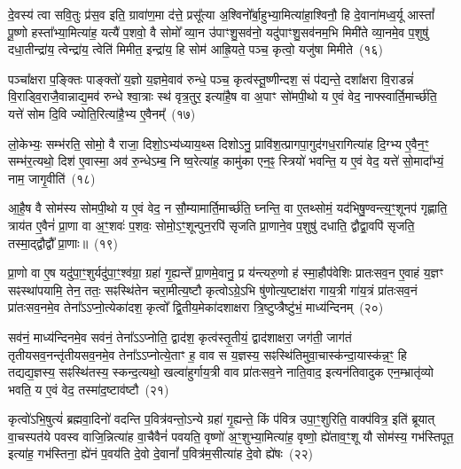 {\anuvakamend[{वा॒चो हव॑म॒भिघृ॑तानां गृह्णात्यु॒त पञ्च॑विꣳशतिश्च}]}%

दे॒वस्य॑ त्वा सवि॒तुः प्र॑स॒व इति॒ ग्रावा॑ण॒मा द॑त्ते॒ प्रसू᳚त्या अ॒श्विनो᳚र्बा॒हुभ्या॒मित्या॑हा॒श्विनौ॒ हि दे॒वाना॑मध्व॒र्यू आस्तां᳚ पू॒ष्णो हस्ता᳚भ्या॒मित्या॑ह॒ यत्यै॑ प॒शवो॒ वै सोमो᳚ व्या॒न उ॑पाꣳशु॒सव॑नो॒ यदु॑पाꣳशु॒सव॑नम॒भि मिमी॑ते व्या॒नमे॒व प॒शुषु॑ दधा॒तीन्द्रा॑य॒ त्वेन्द्रा॑य॒ त्वेति॑ मिमीत॒ इन्द्रा॑य॒ हि सोम॑ आह्रि॒यते॒ पञ्च॒ कृत्वो॒ यजु॑षा मिमीते~(१६)

पञ्चा᳚क्षरा प॒ङ्क्तिः पाङ्क्तो॑ य॒ज्ञो य॒ज्ञमे॒वाव॑ रुन्धे॒ पञ्च॒ कृत्व॑स्तू॒ष्णीन्दश॒ सं प॑द्यन्ते॒ दशा᳚क्षरा वि॒राडन्नं॑ वि॒राड्वि॒राजै॒वान्नाद्य॒मव॑ रुन्धे श्वा॒त्राः स्थ॑ वृत्र॒तुर॒ इत्या॑है॒ष वा अ॒पाꣳ सो॑मपी॒थो य ए॒वं वेद॒ नाफ्स्वार्ति॒मार्च्छ॑ति॒ यत्ते॑ सोम दि॒वि ज्योति॒रित्या॑है॒भ्य ए॒वैनम्᳚~(१७)

लो॒केभ्यः॒ सम्भ॑रति॒ सोमो॒ वै राजा॒ दिशो॒\-ऽभ्य॑ध्याय॒थ्स दिशो\-ऽनु॒ प्रावि॑श॒त्प्रागपा॒गुद॑गध॒रागित्या॑ह दि॒ग्भ्य ए॒वैन॒ꣳ॒ सम्भ॑र॒त्यथो॒ दिश॑ ए॒वास्मा॒ अव॑ रु॒न्धे\-ऽम्ब॒ नि ष्व॒रेत्या॑ह॒ कामु॑का एन॒ꣴ॒ स्त्रियो॑ भवन्ति॒ य ए॒वं वेद॒ यत्ते॑ सो॒मादा᳚भ्यं॒ नाम॒ जागृ॒वीति॑~(१८)

आ॒है॒ष वै सोम॑स्य सोमपी॒थो य ए॒वं वेद॒ न सौ॒म्यामार्ति॒मार्च्छ॑ति॒ घ्नन्ति॒ वा ए॒तथ्सोमं॒ यद॑भिषु॒ण्वन्त्य॒ꣳ॒शूनप॑ गृह्णाति॒ त्राय॑त ए॒वैनं॑ प्रा॒णा वा अ॒ꣳ॒शवः॑ प॒शवः॒ सोमो॒\-ऽꣳ॒शून्पुन॒रपि॑ सृजति प्रा॒णाने॒व प॒शुषु॑ दधाति॒ द्वौद्वा॒वपि॑ सृजति॒ तस्मा॒द्द्वौद्वौ᳚ प्रा॒णाः॥~(१९)

{\anuvakamend[{यजु॑षा मिमीत एनं॒ जागृ॒वीति॒ चतु॑श्चत्वारिꣳशच्च}]}%

प्रा॒णो वा ए॒ष यदु॑पा॒ꣳ॒शुर्यदु॑पा॒ꣳ॒श्व॑ग्रा॒ ग्रहा॑ गृ॒ह्यन्ते᳚ प्रा॒णमे॒वानु॒ प्र य॑न्त्यरु॒णो ह॑ स्मा॒हौप॑वेशिः प्रातःसव॒न ए॒वाहं य॒ज्ञꣳ सꣴस्था॑पयामि॒ तेन॒ ततः॒ सꣴस्थि॑तेन चरा॒मीत्य॒ष्टौ कृत्वो\-ऽग्रे॒\-ऽभि षु॑णोत्य॒ष्टाक्ष॑रा गाय॒त्री गा॑य॒त्रं प्रा॑तःसव॒नं प्रा॑तःसव॒नमे॒व तेना᳚\-ऽऽ\-प्नो॒त्येका॑\-दश॒ कृत्वो᳚ द्वि॒तीय॒मेका॑\-दशाक्षरा त्रि॒ष्टुप्त्रैष्टु॑भं॒ माध्य॑न्दिनम्~(२०)

सव॑नं॒ माध्य॑न्दिनमे॒व सव॑नं॒ तेना᳚\-ऽऽ\-प्नोति॒ द्वाद॑श॒ कृत्व॑स्तृ॒तीयं॒ द्वाद॑शाक्षरा॒ जग॑ती॒ जाग॑तं तृतीयसव॒नन्तृ॑तीयसव॒नमे॒व तेना᳚\-ऽऽ\-प्नोत्ये॒ताꣳ ह॒ वाव स य॒ज्ञस्य॒ सꣴस्थि॑तिमुवा॒चास्क॑न्दा॒यास्क॑न्न॒ꣳ॒ हि तद्यद्य॒ज्ञस्य॒ सꣴस्थि॑तस्य॒ स्कन्द॒त्यथो॒ खल्वा॑हुर्गाय॒त्री वाव प्रा॑तःसव॒ने नाति॒वाद॒ इत्यन॑तिवादुक एन॒म्भ्रातृ॑व्यो भवति॒ य ए॒वं वेद॒ तस्मा॑द॒ष्टाव॑ष्टौ~(२१)

कृत्वो॑\-ऽभि॒षुत्यं॑ ब्रह्मवा॒दिनो॑ वदन्ति प॒वित्र॑वन्तो॒\-ऽन्ये ग्रहा॑ गृ॒ह्यन्ते॒ किं प॑वित्र उपा॒ꣳ॒शुरिति॒ वाक्प॑वित्र॒ इति॑ ब्रूयात् वा॒चस्पत॑ये पवस्व वाजि॒न्नित्या॑ह वा॒चैवैनं॑ पवयति॒ वृष्णो॑ अ॒ꣳ॒शुभ्या॒मित्या॑ह॒ वृष्णो॒ ह्ये॑ताव॒ꣳ॒शू यौ सोम॑स्य॒ गभ॑स्तिपूत॒ इत्या॑ह॒ गभ॑स्तिना॒ ह्ये॑नं प॒वय॑ति दे॒वो दे॒वानां᳚ प॒वित्र॑म॒सीत्या॑ह दे॒वो ह्ये॑षः~(२२)

